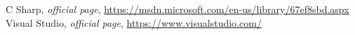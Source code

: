 \begin{thebibliography}{99999}
\singlespace\normalsize

 C Sharp, \textit{ official page}, \url{https://msdn.microsoft.com/en-us/library/67ef8sbd.aspx}
 Visual Studio, \textit{ official page}, \url{https://www.visualstudio.com/}
\end{thebibliography}
